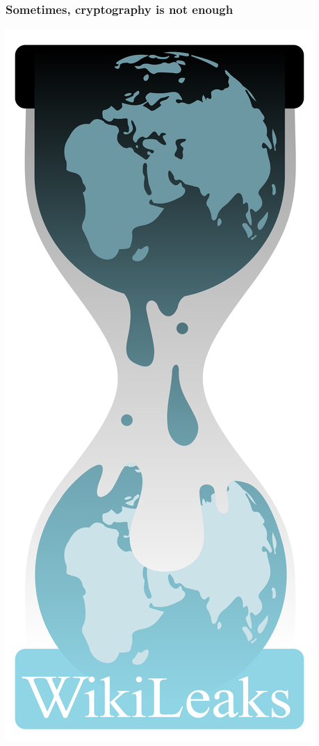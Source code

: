\documentclass[german,table]{beamer}
\begin{document}
\begin{frame}
  \frametitle{Sometimes, cryptography is not enough}
  \begin{center}
    \includegraphics[height=.8\textheight]{wikileaks}  
  \end{center}
\end{frame}
\end{document}
